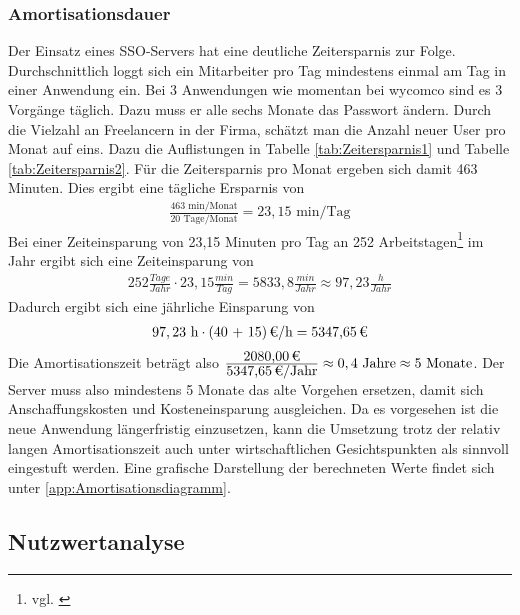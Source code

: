 
\subsubsection{Amortisationsdauer}
\label{sec:Amortisationsdauer}

Der Einsatz eines \ac{SSO}-Servers hat eine deutliche Zeitersparnis zur Folge. Durchschnittlich loggt sich ein Mitarbeiter pro Tag mindestens einmal am Tag in einer Anwendung ein. Bei 3 Anwendungen wie momentan bei wycomco sind es 3 Vorgänge täglich. Dazu muss er alle sechs Monate das Passwort ändern. Durch die Vielzahl an Freelancern in der Firma, schätzt man die Anzahl neuer User pro Monat auf eins. 
Dazu die Auflistungen in Tabelle \ref{tab:Zeitersparnis1} und Tabelle \ref{tab:Zeitersparnis2}.
Für die Zeitersparnis pro Monat ergeben sich damit 463 Minuten. 
Dies ergibt eine tägliche Ersparnis von
\begin{eqnarray}
\frac{463 \mbox{ min/Monat}}{20 \mbox{ Tage/Monat}} = 23,15 \mbox{ min/Tag}
\end{eqnarray}
Bei einer Zeiteinsparung von 23,15 Minuten pro Tag an 252 Arbeitstagen\footnote{vgl. \cite{arbeitstage}} im Jahr ergibt sich eine Zeiteinsparung von 
\begin{eqnarray}
252 \frac{Tage}{Jahr} \cdot 23,15 \frac{min}{Tag} = 5833,8 \frac{min}{Jahr} \approx 97,23 \frac{h}{Jahr} 
\end{eqnarray}
Dadurch ergibt sich eine jährliche Einsparung von 
\begin{eqnarray}
97,23 \mbox{ h} \cdot \eur{(40 + 15)}{\mbox{/h}} = \eur{5347,65}
\end{eqnarray}
Die Amortisationszeit beträgt also $\frac{\eur{2080,00}}{\eur{5347,65}\mbox{/Jahr}} \approx 0,4 \mbox{ Jahre} \approx 5 \mbox{ Monate}$.
Der Server muss also mindestens 5 Monate das alte Vorgehen ersetzen, damit sich Anschaffungskosten und Kosteneinsparung ausgleichen. Da es vorgesehen ist die neue Anwendung längerfristig einzusetzen, kann die Umsetzung trotz der relativ langen Amortisationszeit auch unter wirtschaftlichen Gesichtspunkten als sinnvoll eingestuft werden.
Eine grafische Darstellung der berechneten Werte findet sich unter \ref{app:Amortisationsdiagramm}.

\subsection{Nutzwertanalyse}
\label{sec:Nutzwertanalyse}

